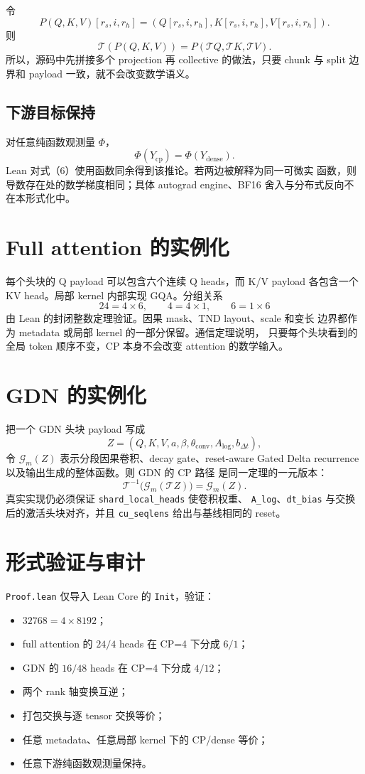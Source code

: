 \documentclass[11pt,a4paper]{ctexart}
\newcommand{\Tmap}{\mathcal T}
\begin{document}
令
\[
P(Q,K,V)[r_s,i,r_h]
=
(Q[r_s,i,r_h],K[r_s,i,r_h],V[r_s,i,r_h]).
\]
则
\[
\Tmap(P(Q,K,V))
=
P(\Tmap Q,\Tmap K,\Tmap V). \tag{7}
\]
所以，源码中先拼接多个 projection 再 collective 的做法，只要
chunk 与 split 边界和 payload 一致，就不会改变数学语义。

\subsection{下游目标保持}

对任意纯函数观测量 $\Phi$，
\[
\Phi(Y_{\mathrm{cp}})=\Phi(Y_{\mathrm{dense}}). \tag{8}
\]
Lean 对式（6）使用函数同余得到该推论。若两边被解释为同一可微实
函数，则导数存在处的数学梯度相同；具体 autograd engine、BF16
舍入与分布式反向不在本形式化中。

\section{Full attention 的实例化}

每个头块的 Q payload 可以包含六个连续 Q heads，而 K/V payload
各包含一个 KV head。局部 kernel 内部实现 GQA。分组关系
\[
24=4\times6,\qquad 4=4\times1,\qquad 6=1\times6
\]
由 Lean 的封闭整数定理验证。因果 mask、TND layout、scale 和变长
边界都作为 metadata 或局部 kernel 的一部分保留。通信定理说明，
只要每个头块看到的全局 token 顺序不变，CP 本身不会改变 attention
的数学输入。

\section{GDN 的实例化}

把一个 GDN 头块 payload 写成
\[
Z=(Q,K,V,a,\beta,\theta_{\mathrm{conv}},A_{\log},b_{\Delta t}),
\]
令 $\mathcal G_m(Z)$ 表示分段因果卷积、decay gate、reset-aware
Gated Delta recurrence 以及输出生成的整体函数。则 GDN 的 CP 路径
是同一定理的一元版本：
\[
\Tmap^{-1}\bigl(\mathcal G_m(\Tmap Z)\bigr)
=
\mathcal G_m(Z). \tag{9}
\]
真实实现仍必须保证 \texttt{shard\_local\_heads} 使卷积权重、
\texttt{A\_log}、\texttt{dt\_bias} 与交换后的激活头块对齐，并且
\texttt{cu\_seqlens} 给出与基线相同的 reset。

\section{形式验证与审计}

\texttt{Proof.lean} 仅导入 Lean Core 的 \texttt{Init}，验证：

\begin{itemize}
  \item $32768=4\times8192$；
  \item full attention 的 $24/4$ heads 在 CP=4 下分成 $6/1$；
  \item GDN 的 $16/48$ heads 在 CP=4 下分成 $4/12$；
  \item 两个 rank 轴变换互逆；
  \item 打包交换与逐 tensor 交换等价；
  \item 任意 metadata、任意局部 kernel 下的 CP/dense 等价；
  \item 任意下游纯函数观测量保持。
\end{itemize}
\end{document}
